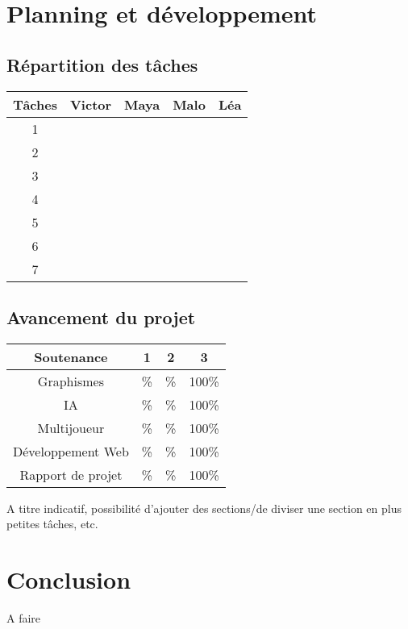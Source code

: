 \documentclass{article}
\begin{document}
\section{Planning et développement}
\subsection{Répartition des tâches}
\begin{center}
	\begin{tabular}{|c||c|c|c|c|}
	\hline
    \textbf{Tâches} & \textbf{Victor} & \textbf{Maya} & \textbf{Malo} & \textbf{Léa} \\ \hline
    1 & & & & \\ \hline
    2 &  &  &  & \\ \hline
    3 &  & &  & \\ \hline
    4 & & & & \\ \hline
    5 & & & &\\ \hline
    6 &  & & &\\ \hline
    7 &  &  & &\\ 
    \hline
	\end{tabular}
\end{center}
\subsection{Avancement du projet}
\begin{center}
   \begin{tabular}{ | c || c | c | c | }
     \hline
 	 \textbf{Soutenance} & \textbf{1} & \textbf{2} & \textbf{3}    \\ \hline
     Graphismes & \% & \% & 100\% \\ \hline
     IA & \% & \%  & 100\% \\ \hline
     Multijoueur & \% & \% & 100\% \\ \hline
     Développement Web & \% & \% & 100\% \\ \hline
     Rapport de projet & \% & \% & 100\% \\
     \hline
   \end{tabular}
 \end{center}

A titre indicatif, possibilité d'ajouter des sections/de diviser une section en plus petites tâches, etc.

\section{Conclusion}
A faire
\end{document}
